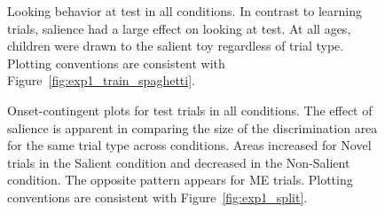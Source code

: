 \documentclass[man,floatsintext]{apa6}
\begin{document}
\begin{figure}[tb]
	\caption{\label{fig:exp1and2_test_spaghetti} Looking behavior at test in all conditions. In contrast to learning trials, salience had a large effect on looking at test. At all ages, children were drawn to the salient toy regardless of trial type. Plotting conventions are consistent with Figure~\ref{fig:exp1_train_spaghetti}.}
\end{figure}

\begin{figure}[tb]
	\caption{\label{fig:exp1and2_split} Onset-contingent plots for test trials in all conditions. The effect of salience is apparent in comparing the size of the discrimination area for the same trial type across conditions. Areas increased for Novel trials in the Salient condition and decreased in the Non-Salient condition. The opposite pattern appears for ME trials. Plotting conventions are consistent with Figure~\ref{fig:exp1_split}.}
\end{figure}
\end{document}
